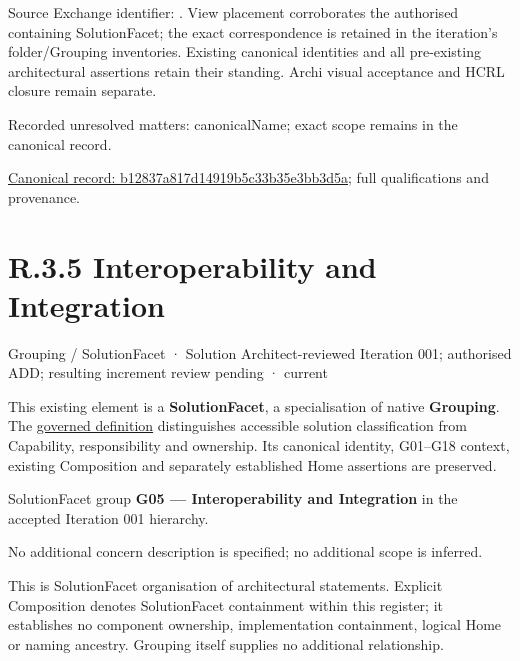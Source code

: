 Source Exchange identifier: \texttt{}. View placement corroborates
the authorised containing SolutionFacet; the exact correspondence is retained in the
iteration's folder/Grouping inventories. Existing canonical identities and all
pre-existing architectural assertions retain their standing. Archi visual
acceptance and HCRL closure remain separate.


{\small Recorded unresolved matters: canonicalName; exact scope remains in the canonical record.}\par
{\footnotesize \href{../../../../../../../continuum/grouping/b12837a817d14919b5c33b35e3bb3d5a.md}{Canonical record: b12837a817d14919b5c33b35e3bb3d5a}; full qualifications and provenance.}\par
\section*{R.3.5 Interoperability and Integration}
\label{navigation:R.3.5}

\label{element:098d2e468cd14029b43ec6dbd07374fd}
{\small Grouping / SolutionFacet · Solution Architect-reviewed Iteration 001; authorised ADD; resulting increment review pending · current}\par

This existing element is a \textbf{SolutionFacet}, a specialisation of native
\textbf{Grouping}. The \href{\detokenize{../../../../../../../governance/continuum-representation.md#solutionfacet-classification--1119-candidate}}{governed definition}
distinguishes accessible solution classification from Capability, responsibility
and ownership. Its canonical identity, G01–G18 context, existing Composition
and separately established Home assertions are preserved.



SolutionFacet group \textbf{G05 — Interoperability and Integration} in the accepted Iteration 001 hierarchy.



No additional concern description is specified; no additional scope is inferred.



This is SolutionFacet organisation of architectural statements. Explicit Composition denotes SolutionFacet containment within this register; it establishes no component ownership, implementation containment, logical Home or naming ancestry. Grouping itself supplies no additional relationship.


